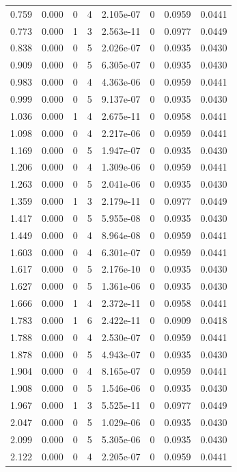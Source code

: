 \documentclass[preview]{standalone}
\begin{document}
{{\begin{tabular}{L{1.2cm}C{1.2cm} C{0.3cm}C{0.5cm} C{1.4cm}C{1.4cm} C{1.4cm}C{1.4cm}}
  0.759  &  0.000  & 0     &  4 &  2.105e-07  & 0  & 0.0959 &  0.0441   \\ 
  0.773  &  0.000  & 1     &  3 &  2.563e-11  & 0  & 0.0977 &  0.0449   \\ 
  0.838  &  0.000  & 0     &  5 &  2.026e-07  & 0  & 0.0935 &  0.0430   \\ 
  0.909  &  0.000  & 0     &  5 &  6.305e-07  & 0  & 0.0935 &  0.0430   \\ 
  0.983  &  0.000  & 0     &  4 &  4.363e-06  & 0  & 0.0959 &  0.0441   \\ 
  0.999  &  0.000  & 0     &  5 &  9.137e-07  & 0  & 0.0935 &  0.0430   \\ 
  1.036  &  0.000  & 1     &  4 &  2.675e-11  & 0  & 0.0958 &  0.0441   \\ 
  1.098  &  0.000  & 0     &  4 &  2.217e-06  & 0  & 0.0959 &  0.0441   \\ 
  1.169  &  0.000  & 0     &  5 &  1.947e-07  & 0  & 0.0935 &  0.0430   \\ 
  1.206  &  0.000  & 0     &  4 &  1.309e-06  & 0  & 0.0959 &  0.0441   \\ 
  1.263  &  0.000  & 0     &  5 &  2.041e-06  & 0  & 0.0935 &  0.0430   \\ 
  1.359  &  0.000  & 1     &  3 &  2.179e-11  & 0  & 0.0977 &  0.0449   \\ 
  1.417  &  0.000  & 0     &  5 &  5.955e-08  & 0  & 0.0935 &  0.0430   \\ 
  1.449  &  0.000  & 0     &  4 &  8.964e-08  & 0  & 0.0959 &  0.0441   \\ 
  1.603  &  0.000  & 0     &  4 &  6.301e-07  & 0  & 0.0959 &  0.0441   \\ 
  1.617  &  0.000  & 0     &  5 &  2.176e-10  & 0  & 0.0935 &  0.0430   \\ 
  1.627  &  0.000  & 0     &  5 &  1.361e-06  & 0  & 0.0935 &  0.0430   \\ 
  1.666  &  0.000  & 1     &  4 &  2.372e-11  & 0  & 0.0958 &  0.0441   \\ 
  1.783  &  0.000  & 1     &  6 &  2.422e-11  & 0  & 0.0909 &  0.0418   \\ 
  1.788  &  0.000  & 0     &  4 &  2.530e-07  & 0  & 0.0959 &  0.0441   \\ 
  1.878  &  0.000  & 0     &  5 &  4.943e-07  & 0  & 0.0935 &  0.0430   \\ 
  1.904  &  0.000  & 0     &  4 &  8.165e-07  & 0  & 0.0959 &  0.0441   \\ 
  1.908  &  0.000  & 0     &  5 &  1.546e-06  & 0  & 0.0935 &  0.0430   \\ 
  1.967  &  0.000  & 1     &  3 &  5.525e-11  & 0  & 0.0977 &  0.0449   \\ 
  2.047  &  0.000  & 0     &  5 &  1.029e-06  & 0  & 0.0935 &  0.0430   \\ 
  2.099  &  0.000  & 0     &  5 &  5.305e-06  & 0  & 0.0935 &  0.0430   \\ 
  2.122  &  0.000  & 0     &  4 &  2.205e-07  & 0  & 0.0959 &  0.0441   \\ 
\hline 
\end{tabular} 

}}
\end{document}

